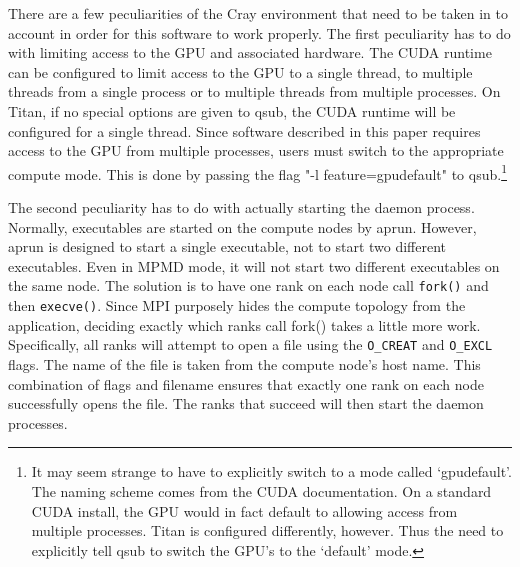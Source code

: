 There are a few peculiarities of the Cray environment that need to be taken in to account in order for this software to work properly.  The first peculiarity has to do with limiting access to the GPU and associated hardware.  The CUDA runtime can be configured to limit access to the GPU to a single thread, to multiple threads from a single process or to multiple threads from multiple processes.  On Titan, if no special options are given to qsub, the CUDA runtime will be configured for a single thread.  Since software described in this paper requires access to the GPU from multiple processes, users must switch to the appropriate compute mode.  This is done by passing the flag "-l feature=gpudefault" to qsub.\footnote{It may seem strange to have to explicitly switch to a mode called `gpudefault'.  The naming scheme comes from the CUDA documentation.  On a standard CUDA install, the GPU would in fact default to allowing access from multiple processes.  Titan is configured differently, however.  Thus the need to explicitly tell qsub to switch the GPU's to the `default' mode.}

The second peculiarity has to do with actually starting the daemon process.  Normally, executables are started on the compute nodes by aprun.  However, aprun is designed to start a single executable, not to start two different executables.  Even in MPMD mode, it will not start two different executables on the same node.  The solution is to have one rank on each node call \texttt{fork()} and then \texttt{execve()}.  Since MPI purposely hides the compute topology from the application, deciding exactly which ranks call fork() takes a little more work.  Specifically, all ranks will attempt to open a file using the \texttt{O\_CREAT} and 
\texttt{O\_EXCL} flags.  The name of the file is taken from the compute node's host name.  This combination of flags and filename ensures that exactly one rank on each node successfully opens the file.  The ranks that succeed will then start the daemon processes.

%
%


